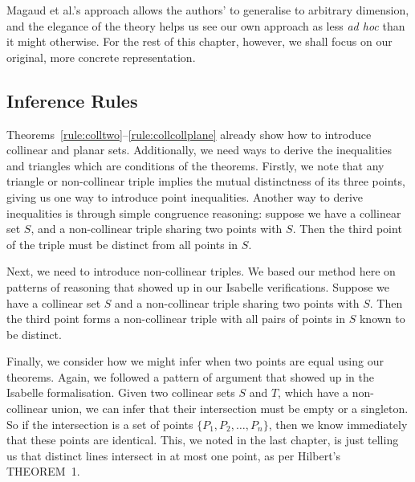 Magaud et al.'s approach allows the authors' to generalise to arbitrary dimension, and the elegance of the theory helps us see our own approach as less \emph{ad hoc} than it might otherwise. For the rest of this chapter, however, we shall focus on our original, more concrete representation.

\subsection{Inference Rules}\label{list:Procedures}
Theorems~\ref{rule:colltwo}--\ref{rule:collcollplane} already show how to introduce collinear and planar sets. Additionally, we need ways to derive the inequalities and triangles which are conditions of the theorems. Firstly, we note that any triangle or non-collinear triple implies the mutual distinctness of its three points, giving us one way to introduce point inequalities. Another way to derive inequalities is through simple congruence reasoning: suppose we have a collinear set $S$, and a non-collinear triple sharing two points with $S$. Then the third point of the triple must be distinct from all points in $S$. 

Next, we need to introduce non-collinear triples. We based our method here on patterns of reasoning that showed up in our Isabelle verifications. Suppose we have a collinear set $S$ and a non-collinear triple sharing two points with $S$. Then the third point forms a non-collinear triple with all pairs of points in $S$ known to be distinct.

Finally, we consider how we might infer when two points are equal using our theorems. Again, we followed a pattern of argument that showed up in the Isabelle formalisation. Given two collinear sets $S$ and $T$, which have a non-collinear union, we can infer that their intersection must be empty or a singleton. So if the intersection is a set of points $\{P_1,P_2,\ldots,P_n\}$, then we know immediately that these points are identical. This, we noted in the last chapter, is just telling us that distinct lines intersect in at most one point, as per Hilbert's THEOREM~1.

